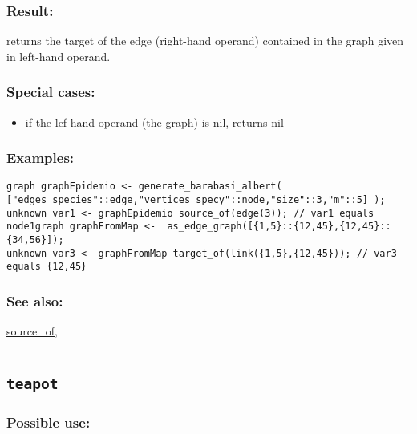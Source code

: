 \documentclass[]{book}
\providecommand{\tightlist}{%
  \setlength{\itemsep}{0pt}\setlength{\parskip}{0pt}}
\theoremstyle{definition}
\theoremstyle{definition}
\theoremstyle{definition}
\theoremstyle{remark}
\begin{document}
\subsubsection{Result:}\label{result-498}

returns the target of the edge (right-hand operand) contained in the
graph given in left-hand operand.

\subsubsection{Special cases:}\label{special-cases-135}

\begin{itemize}
\tightlist
\item
  if the lef-hand operand (the graph) is nil, returns nil
\end{itemize}

\subsubsection{Examples:}\label{examples-356}

\begin{verbatim}
graph graphEpidemio <- generate_barabasi_albert( ["edges_species"::edge,"vertices_specy"::node,"size"::3,"m"::5] );  
unknown var1 <- graphEpidemio source_of(edge(3)); // var1 equals node1graph graphFromMap <-  as_edge_graph([{1,5}::{12,45},{12,45}::{34,56}]);  
unknown var3 <- graphFromMap target_of(link({1,5},{12,45})); // var3 equals {12,45}
\end{verbatim}

\subsubsection{See also:}\label{see-also-203}

\href{OperatorsSZ\#source_of}{source\_of},

\begin{center}\rule{0.5\linewidth}{\linethickness}\end{center}

\subsection{\texorpdfstring{\texttt{teapot}}{teapot}}\label{teapot}

\subsubsection{Possible use:}\label{possible-use-516}
\end{document}
